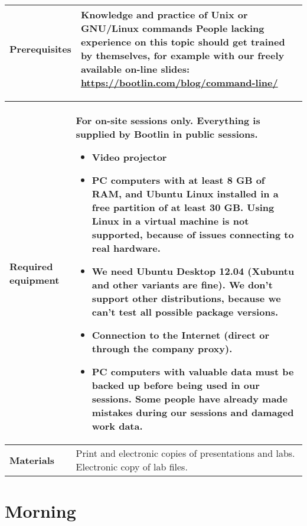 \documentclass[a4paper,12pt,obeyspaces,spaces,hyphens]{article}
\begin{document}
{\begin{tabularx}{\textwidth}{|g|h|}
    {\bf Prerequisites} & {\bf Knowledge and practice of Unix or
      GNU/Linux commands}
    \newline People lacking experience on this topic should get
    trained by themselves, for example with our freely available
    on-line slides:
    \newline \url{https://bootlin.com/blog/command-line/} \vspace{1em}
     \\
    \hline
  \end{tabularx}

  \begin{tabularx}{\textwidth}{|g|h|}
    {\bf Required equipment} &
    {\bf For on-site sessions only.}
    \newline Everything is supplied by Bootlin in public sessions.
    \begin{itemize}
    \item Video projector
    \item PC computers with at least 8 GB of RAM, and Ubuntu Linux
    installed in a {\bf free partition of at least 30 GB. Using Linux
      in a virtual machine is not supported}, because of issues
    connecting to real hardware.
    \item We need Ubuntu Desktop 12.04 (Xubuntu and other
    variants are fine). We don't support other
    distributions, because we can't test all possible package versions.
    \item {\bf Connection to the Internet} (direct or through the
    company proxy).
    \item {\bf PC computers with valuable data must be backed up}
    before being used in our sessions.  Some people have already made
    mistakes during our sessions and damaged work data.
    \end{itemize}\\
    \hline

    {\bf Materials} & Print and electronic copies of presentations and
    labs.
    \newline Electronic copy of lab files.\\
    \hline

\end{tabularx}}
\normalsize


\section{Morning}
\end{document}
